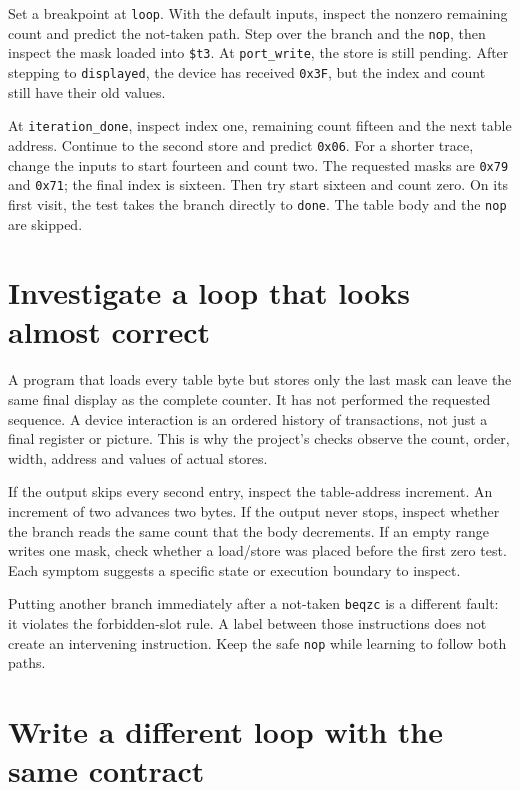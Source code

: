Set a breakpoint at \texttt{loop}. With the default inputs, inspect the nonzero
remaining count and predict the not-taken path. Step over the branch and the
\texttt{nop}, then inspect the mask loaded into \texttt{\$t3}. At
\texttt{port\_write}, the store is still pending. After stepping to
\texttt{displayed}, the device has received \texttt{0x3F}, but the index and count
still have their old values.

At \texttt{iteration\_done}, inspect index one, remaining count fifteen and the
next table address. Continue to the second store and predict \texttt{0x06}.
For a shorter trace, change the inputs to start fourteen and count two. The
requested masks are \texttt{0x79} and \texttt{0x71}; the final index is sixteen.
Then try start sixteen and count zero. On its first visit, the test takes the
branch directly to \texttt{done}. The table body and the \texttt{nop} are skipped.

\section{Investigate a loop that looks almost correct}

A program that loads every table byte but stores only the last mask can leave the
same final display as the complete counter. It has not performed the requested
sequence. A device interaction is an ordered history of transactions, not just
a final register or picture. This is why the project's checks observe the count,
order, width, address and values of actual stores.

If the output skips every second entry, inspect the table-address increment.
An increment of two advances two bytes. If the output never stops, inspect whether
the branch reads the same count that the body decrements. If an empty range writes
one mask, check whether a load/store was placed before the first zero test.
Each symptom suggests a specific state or execution boundary to inspect.

Putting another branch immediately after a not-taken \texttt{beqzc} is a different
fault: it violates the forbidden-slot rule. A label between those instructions
does not create an intervening instruction. Keep the safe \texttt{nop} while
learning to follow both paths.

\section{Write a different loop with the same contract}

